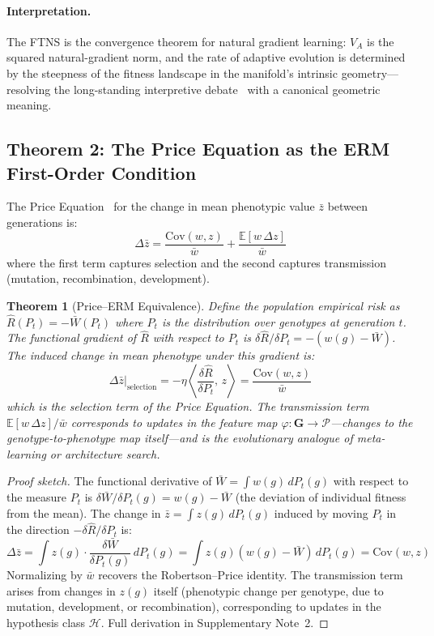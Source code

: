 \documentclass[12pt]{article}
\newtheorem{theorem}{Theorem}
\theoremstyle{remark}
\begin{document}
\paragraph{Interpretation.} The FTNS is the convergence theorem for natural gradient learning: $V_A$ is the squared natural-gradient norm, and the rate of adaptive evolution is determined by the steepness of the fitness landscape in the manifold's intrinsic geometry---resolving the long-standing interpretive debate~\cite{ewens1989,lessard1997} with a canonical geometric meaning.

\subsection{Theorem 2: The Price Equation as the ERM First-Order Condition}

The Price Equation~\cite{price1970,price1972} for the change in mean phenotypic value $\bar{z}$ between generations is:
\[
  \Delta \bar{z} = \frac{\mathrm{Cov}(w, z)}{\bar{w}} + \frac{\mathbb{E}[w\, \Delta z]}{\bar{w}}
\]
where the first term captures selection and the second captures transmission (mutation, recombination, development).

\begin{theorem}[Price--ERM Equivalence]
Define the population empirical risk as $\hat{R}(P_t) = -\bar{W}(P_t)$ where $P_t$ is the distribution over genotypes at generation $t$. The functional gradient of $\hat{R}$ with respect to $P_t$ is $\delta\hat{R}/\delta P_t = -(w(g) - \bar{W})$. The induced change in mean phenotype under this gradient is:
\[
  \Delta\bar{z}\big|_{\text{selection}} = -\eta\left\langle \frac{\delta\hat{R}}{\delta P_t},\, z \right\rangle = \frac{\mathrm{Cov}(w, z)}{\bar{w}}
\]
which is the selection term of the Price Equation. The transmission term $\mathbb{E}[w\,\Delta z]/\bar{w}$ corresponds to updates in the feature map $\varphi: \mathbf{G} \to \mathcal{P}$---changes to the genotype-to-phenotype map itself---and is the evolutionary analogue of meta-learning or architecture search.
\end{theorem}

\begin{proof}[Proof sketch]
The functional derivative of $\bar{W} = \int w(g)\, dP_t(g)$ with respect to the measure $P_t$ is $\delta\bar{W}/\delta P_t(g) = w(g) - \bar{W}$ (the deviation of individual fitness from the mean). The change in $\bar{z} = \int z(g)\, dP_t(g)$ induced by moving $P_t$ in the direction $-\delta\hat{R}/\delta P_t$ is:
\[
  \Delta\bar{z} = \int z(g) \cdot \frac{\delta\bar{W}}{\delta P_t(g)}\, dP_t(g)
                = \int z(g)(w(g) - \bar{W})\, dP_t(g) = \mathrm{Cov}(w, z)
\]
Normalizing by $\bar{w}$ recovers the Robertson--Price identity. The transmission term arises from changes in $z(g)$ itself (phenotypic change per genotype, due to mutation, development, or recombination), corresponding to updates in the hypothesis class $\mathcal{H}$. Full derivation in Supplementary Note~2.
\end{proof}
\end{document}
